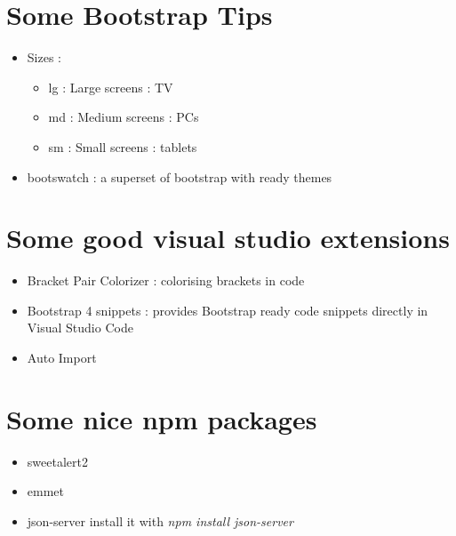 \documentclass{article}
\begin{document}
\section{Some Bootstrap Tips}
\begin{itemize}
    \item Sizes : 
    \begin{itemize}
        \item lg : Large screens : TV
        \item md : Medium screens : PCs
        \item sm : Small screens : tablets
    \end{itemize}
    \item bootswatch : a superset of bootstrap with ready themes
\end{itemize}

\section{Some good visual studio extensions}
\begin{itemize}
    \item Bracket Pair Colorizer : colorising brackets in code
    \item Bootstrap 4 snippets : provides Bootstrap ready code snippets directly in Visual Studio Code
    \item Auto Import
\end{itemize}
\section{Some nice npm packages}
\begin{itemize}
    \item sweetalert2
    \item emmet
    \item json-server install it with \textit{npm install json-server}
    
\end{itemize}
\end{document}
